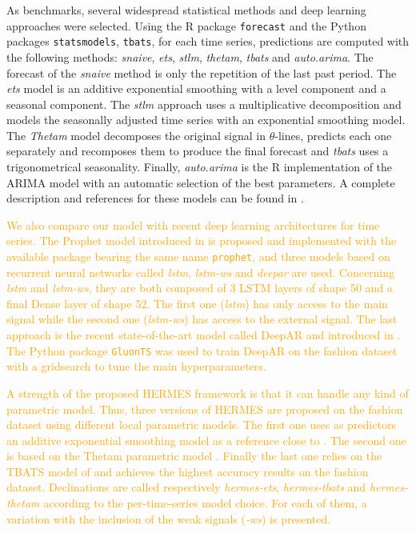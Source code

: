 \documentclass[10pt]{article} %
\begin{document}
As benchmarks, several widespread statistical methods and deep learning approaches were selected. Using the R package \texttt{forecast} and the Python packages \texttt{statsmodels},  \texttt{tbats}, for each time series, predictions are computed with the following methods: \textit{snaive}, \textit{ets}, \textit{stlm}, \textit{thetam}, \textit{tbats} and \textit{auto.arima}. The forecast of the \textit{snaive} method is only the repetition of the last past period. The \textit{ets} model is an additive exponential smoothing with a level component and a seasonal component. The \textit{stlm} approach uses a multiplicative decomposition and models the seasonally adjusted time series with an exponential smoothing model. The \textit{Thetam} model decomposes the original signal in $\theta$-lines, predicts each one separately and recomposes them to produce the final forecast and \textit{tbats} uses a trigonometrical seasonality. Finally, \textit{auto.arima} is the R implementation of the ARIMA model with an automatic selection of the best parameters. A complete description and references for these models can be found in \citet{hyndman2020}. 

\textcolor{orange}{We also compare our model with recent deep learning architectures for time series. The Prophet model introduced in \citet{Taylor2017} is proposed and implemented with the available package bearing the same name \texttt{prophet}, and three models based on recurrent neural networks called \textit{lstm}, \textit{lstm-ws} and \textit{deepar} are used. Concerning \textit{lstm} and \textit{lstm-ws}, they are both composed of 3 LSTM layers of shape 50 and a final Dense layer of shape 52. The first one (\textit{lstm}) has only access to the main signal while the second one (\textit{lstm-ws}) has access to the external signal. The last approach is the recent state-of-the-art model called DeepAR and introduced in \citet{salinas2020}. The Python package \texttt{GluonTS} \citep{Alexandrov2020} was used to train DeepAR on the fashion dataset with a gridsearch to tune the main hyperparameters.}

\textcolor{orange}{A strength of the proposed HERMES framework is that it can handle any kind of parametric model. Thus, three versions of HERMES are proposed on the fashion dataset using different local parametric models. The first one uses as predictors an additive exponential smoothing model as a reference close to \citet{smyl2020}. The second one is based on the Thetam parametric model \citep{hyndman2020}. Finally the last one relies on the TBATS model of \citet{alysha2011} and  achieves the highest accuracy results on the fashion dataset. Declinations are called respectively \textit{hermes-ets}, \textit{hermes-tbats} and \textit{hermes-thetam} according to the per-time-series model choice. For each of them, a variation with the inclusion of the weak signals (\textit{-ws}) is presented.}
\end{document}
